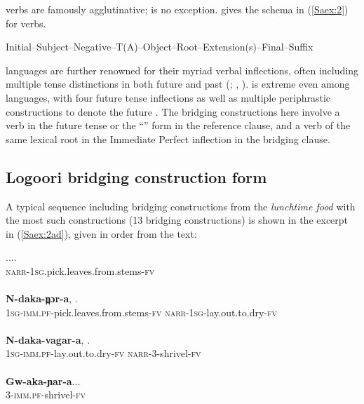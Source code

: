 \documentclass[output=paper]{LSP/langsci}
\begin{document}
 verbs are famously agglutinative;  is no exception. \citet[][90]{Nurse2003} gives the schema in (\ref{Saex:2}) for  verbs.

\begin{exe}
	\ex	\label{Saex:2}
 {\citep[after][90]{Nurse2003}}
\glt	Initial--Subject--Negative--T(A)--Object--Root--Extension(s)--Final--Suffix
\end{exe}


 languages are further renowned for their myriad verbal inflections, often including multiple tense distinctions in both future and past (\citealt{Botne2008}; \citealt{Nurse2003}, \citealt{Nurse2008}).  is extreme even among  languages, with four future tense inflections as well as multiple periphrastic constructions to denote the future \citep{Sarvasy2016}. The  bridging constructions here involve a verb in the future tense or the ``'' form in the reference clause, and a verb of the same lexical root in the Immediate Perfect inflection in the bridging clause. 
%
\subsection{Logoori bridging construction form}
\label{Sa21form}
A typical sequence including bridging constructions from the  \textit{lunchtime food} \citep{Chesi2014} with the most such constructions (13 bridging constructions) is shown in the excerpt in (\ref{Saex:2ad}), given in order from the text:


\begin{exe}
\ex \label{Saex:2ad}
\begin{xlist}
\ex \label{Saex:2a}
\gll ...\underline{}.\\
\textsc{narr}-\textsc{1sg.}pick.leaves.from.stems\textsc{-fv}\\
\glt {}\\
\ex \label{Saex:2b}
\gll \textbf{N-daka-n̪ɔr-a},          \underline{}.\\
\textsc{1sg}-\textsc{imm.pf-}pick.leaves.from.stems-\textsc{fv}  \textsc{narr}-\textsc{1sg}-lay.out.to.dry-\textsc{fv}\\
\glt {}\\
\ex \label{Saex:2c}
\gll \textbf{N-daka-vagar-a},      \underline{}.\\
\textsc{1sg-imm.pf-}lay.out.to.dry-\textsc{fv}  \textsc{narr}-\textsc{3}-shrivel-\textsc{fv}\\
\glt {}\\
\ex \label{Saex:2d}
\gll \textbf{Gw-aka-ɲar-a}...\\     	       
    \textsc{3}-\textsc{imm.pf-}shrivel-\textsc{fv}\\
\glt {} 
\end{xlist}
\end{exe}
\end{document}
